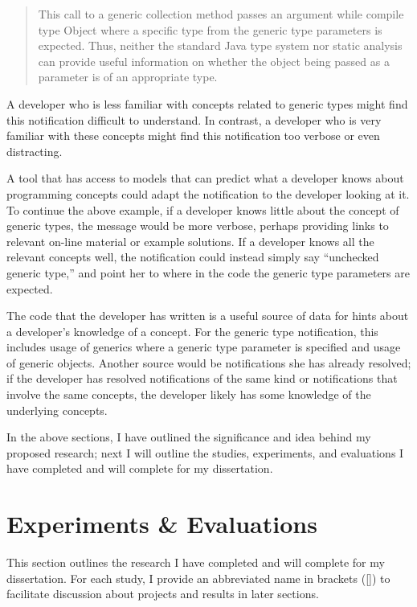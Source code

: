 \documentclass{llncs}
\begin{document}
\vspace*{-1ex}
\begin{quotation}
	\noindent \small{
		This call to a generic collection method passes an argument while compile type Object where a specific type from the generic type parameters is expected. Thus, neither the standard Java type system nor static analysis can provide useful information on whether the object being passed as a parameter is of an appropriate type.}
\end{quotation}
\vspace*{-1ex}

\noindent
A developer who is less familiar with concepts related to generic types might find this notification difficult to understand. 
In contrast, a developer who is very familiar with these concepts might find this notification too verbose or even distracting.

A tool that has access to models that can predict what a developer knows about programming concepts could adapt the notification to the developer looking at it.
To continue the above example, if a developer knows little about the concept of generic types, the message would be more verbose, perhaps providing links to relevant on-line material or example solutions.
If a developer knows all the relevant concepts well, the notification could instead simply say ``unchecked generic type,'' and point her to where in the code the generic type parameters are expected.

The code that the developer has written is a useful source of data for hints about a developer's knowledge of a concept.
For the generic type notification, this includes usage of generics where a generic type parameter is specified and usage of generic objects.
Another source would be notifications she has already resolved; if the developer has resolved notifications of the same kind or notifications that involve the same concepts, the developer likely has some knowledge of the underlying concepts.

In the above sections, I have outlined the significance and idea behind my proposed research; next I will outline the studies, experiments, and evaluations I have completed and will complete for my dissertation.

\section{Experiments \& Evaluations}\label{sec:eval}
This section outlines the research I have completed and will complete for my dissertation. For each study, I provide an abbreviated name in brackets ([]) to facilitate discussion about projects and results in later sections.
\end{document}
